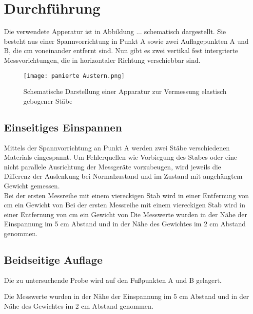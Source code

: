 \section{Durchführung}
\label{sec:Durchführung}

Die verwendete Apperatur ist in Abbildung ... schematisch dargestellt. Sie besteht aus 
einer Spannvorrichtung in Punkt A sowie zwei Auflagepunkten A und B, die %
cm voneinander entfernt sind.
Nun gibt es zwei vertikal fest intergrierte Messvorichtungen, die in horizontaler Richtung 
verschiebbar sind.
\begin{figure}
    \centering
    \texttt{[image: panierte Austern.png]}
    \caption{Schematische Darstellung einer Apparatur zur Vermessung elastisch gebogener Stäbe}
    \label{fig:backfisch}
\end{figure}

\subsection{Einseitiges Einspannen}
    Mittels der Spannvorrichtung an Punkt A werden zwei Stäbe verschiedenen Materials
    eingespannt. Um Fehlerquellen wie Vorbiegung des Stabes oder eine nicht parallele
    Ausrichtung der Messgeräte vorzubeugen, wird jeweils die Differenz der Auslenkung
    bei Normalzustand und im Zustand mit angehängtem Gewicht gemessen.\\
    Bei der ersten Messreihe mit einem viereckigen Stab wird in einer Entfernung von %
    cm ein Gewicht von %
    Bei der ersten Messreihe mit einem viereckigen Stab wird in einer Entfernung von %
    cm ein Gewicht von %
    Die Messwerte wurden in der Nähe der Einspannung im 5 cm Abstand und in der Nähe
    des Gewichtes im 2 cm Abstand genommen.


\subsection{Beidseitige Auflage}
    Die zu untersuchende Probe wird auf den Fußpunkten A und B gelagert. 
    

    Die Messwerte wurden in der Nähe der Einspannung im 5 cm Abstand und in der Nähe
    des Gewichtes im 2 cm Abstand genommen.